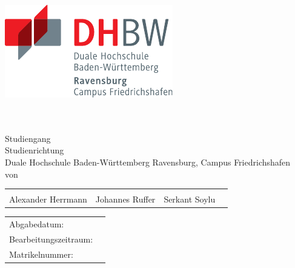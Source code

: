 \thispagestyle{plain}
\begin{titlepage}
\enlargethispage{4.0cm}
\sffamily 								%

\parbox{0.5\linewidth}{
\begin{flushleft}
\end{flushleft}
}
\parbox{0.5\linewidth}{
\begin{flushright}
	\includegraphics[width=0.4\linewidth]{images/DHBW_d_R_FN_46mm_4c}\\[5ex]
\end{flushright}
}
				

\begin{center}

\LARGE{\textsc{\textbf{\titel}}}\\[1.5ex]
\Large{\textbf{\arbeit}}\\[2ex]
\Large{Studiengang \studiengang}\\[2ex]
\large{Studienrichtung \studienrichtung}\\[1ex]
\normalsize{Duale Hochschule Baden-Württemberg Ravensburg, Campus Friedrichshafen}\\[5ex]
von\\[1ex] 

\begin{tabular}{cccc}
	& & &\\
	Alexander Herrmann & Johannes Ruffer & Serkant Soylu\\
\end{tabular}


\end{center}

\begin{flushleft}

\begin{tabular}{ll}
Abgabedatum:					& \quad \abgabe \\
Bearbeitungszeitraum:		   		& \quad \zeitraum \\ 
Matrikelnummer: 			& \quad \matrikelnr \\


\end{tabular}
\end{flushleft}
\end{titlepage}
